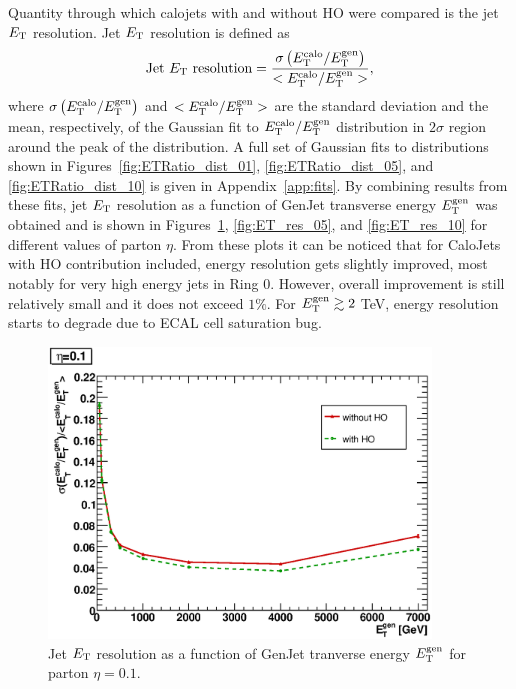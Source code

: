 \documentclass{cmspaper}
\begin{document}
Quantity through which calojets with and without HO were compared is the jet $E_\text T$ resolution. Jet $E_\text T$ resolution is defined as
\begin{equation}
 \text{Jet }E_\text T\text{ resolution}=\frac{\sigma\left(E^\text{calo}_\text T/E^\text{gen}_\text T \right)}{<E^\text{calo}_\text T/E^\text{gen}_\text T>},
\end{equation} 
where $\sigma\left(E^\text{calo}_\text T/E^\text{gen}_\text T \right)$ and $<E^\text{calo}_\text T/E^\text{gen}_\text T>$ are the standard deviation and the mean, respectively, of the Gaussian fit to $E^\text{calo}_\text T/E^\text{gen}_\text T$ distribution in $2\sigma$ region around the peak of the distribution. A full set of Gaussian fits to distributions shown in Figures~\ref{fig:ETRatio_dist_01}, \ref{fig:ETRatio_dist_05}, and \ref{fig:ETRatio_dist_10} is given in Appendix~\ref{app:fits}. By combining results from these fits, jet $E_\text T$ resolution as a function of GenJet transverse energy $E^\text{gen}_\text T$ was obtained and is shown in Figures~\ref{fig:ET_res_01}, \ref{fig:ET_res_05}, and \ref{fig:ET_res_10} for different values of parton $\eta$. From these plots it can be noticed that for CaloJets with HO contribution included, energy resolution gets slightly improved, most notably for very high energy jets in Ring $0$. However, overall improvement is still relatively small and it does not exceed $1\%$. For $E^\text{gen}_\text T\gtrsim2$ TeV, energy resolution starts to degrade due to ECAL cell saturation bug.
\begin{figure}
 \centering
 \includegraphics[width=4in]{figs/ET_resolution_corr_eta0.1.eps}
 \caption{Jet $E_\text T$ resolution as a function of GenJet tranverse energy $E^\text{gen}_\text T$ for parton $\eta=0.1$.}
 \label{fig:ET_res_01}
\end{figure}
\end{document}
